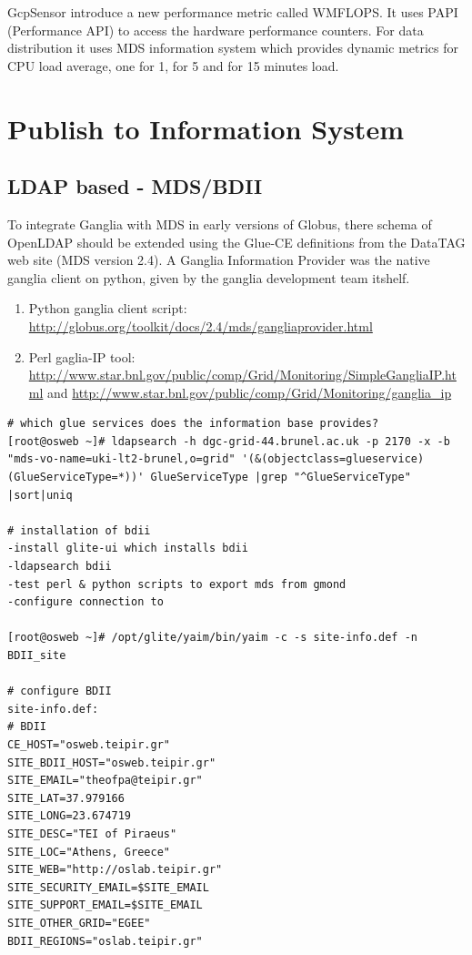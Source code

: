GcpSensor \cite{gcpsensor} introduce a new performance metric called WMFLOPS. It uses PAPI \cite{papi} (Performance API) to access the hardware performance counters. For data distribution it uses MDS information system which provides dynamic metrics for CPU load average, one for 1, for 5 and for 15 minutes load.
\newpage

\section{Publish to Information System}
\cite{goelagent}

\subsection{LDAP based - MDS/BDII}
To integrate Ganglia with MDS in early versions of Globus, there schema of OpenLDAP should be extended using the Glue-CE definitions from the DataTAG web site (MDS version 2.4). A Ganglia Information Provider was the native ganglia client on python, given by the ganglia development team itshelf.
\begin{enumerate}
  \item Python ganglia client script: \url{http://globus.org/toolkit/docs/2.4/mds/gangliaprovider.html}
  \item Perl gaglia-IP tool: \url{http://www.star.bnl.gov/public/comp/Grid/Monitoring/SimpleGangliaIP.html} and \url{http://www.star.bnl.gov/public/comp/Grid/Monitoring/ganglia\_ip}
\end{enumerate}

\begin{verbatim}
# which glue services does the information base provides?
[root@osweb ~]# ldapsearch -h dgc-grid-44.brunel.ac.uk -p 2170 -x -b "mds-vo-name=uki-lt2-brunel,o=grid" '(&(objectclass=glueservice)(GlueServiceType=*))' GlueServiceType |grep "^GlueServiceType" |sort|uniq

# installation of bdii
-install glite-ui which installs bdii
-ldapsearch bdii
-test perl & python scripts to export mds from gmond
-configure connection to 

[root@osweb ~]# /opt/glite/yaim/bin/yaim -c -s site-info.def -n BDII_site

# configure BDII
site-info.def:
# BDII
CE_HOST="osweb.teipir.gr"
SITE_BDII_HOST="osweb.teipir.gr"
SITE_EMAIL="theofpa@teipir.gr"
SITE_LAT=37.979166
SITE_LONG=23.674719
SITE_DESC="TEI of Piraeus"
SITE_LOC="Athens, Greece"
SITE_WEB="http://oslab.teipir.gr"
SITE_SECURITY_EMAIL=$SITE_EMAIL
SITE_SUPPORT_EMAIL=$SITE_EMAIL
SITE_OTHER_GRID="EGEE"
BDII_REGIONS="oslab.teipir.gr"

\end{verbatim}
\newpage

